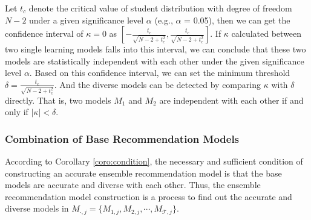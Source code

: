 \documentclass[prodmode,acmtkdd]{acmsmall}
\begin{document}
Let $t_{c}$ denote the critical value of student distribution with
degree of freedom $N-2$ under a given significance level $\alpha$
(e.g., $\alpha$ = 0.05), then we can get the confidence interval of
$\kappa = 0$ as $[-\frac{t_c}{\sqrt{N - 2 + t_c^2}},
\frac{t_c}{\sqrt{N - 2 + t_c^2}}]$. If $\kappa$ calculated between
two single learning models falls into this interval, we can conclude
that these two models are statistically independent with each other
under the given significance level $\alpha$. Based on this
confidence interval, we can set the minimum threshold $\delta =
\frac{t_c}{\sqrt{N - 2 + t_c^2}}$. And the diverse models can be
detected by comparing $\kappa$ with $\delta$ directly. That is, two
models $M_1$ and $M_2$ are independent with each other if and only
if $|\kappa| < \delta$.


\subsubsection{Combination of Base Recommendation
Models}\label{subsubsec:ensembleRecommendation}

According to Corollary \ref{coro:condition}, the necessary and
sufficient condition of constructing an accurate ensemble
recommendation model is that the base models are accurate and
diverse with each other. Thus, the ensemble recommendation model
construction is a process to find out the accurate and diverse
models in $M_{\cdot,j} = \{M_{1,j}, M_{2,j}, \cdots, M_{\mathcal{T},j}\}$.
\end{document}
